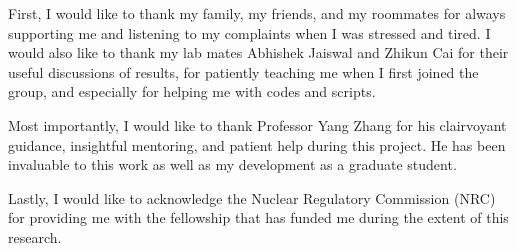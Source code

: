 First, I would like to thank my family, my friends, and my roommates for always supporting me and listening to my complaints when I was stressed and tired.  I would also like to thank my lab mates Abhishek Jaiswal and Zhikun Cai for their useful discussions of results, for patiently teaching me when I first joined the group, and especially for helping me with codes and scripts.  

Most importantly, I would like to thank Professor Yang Zhang for his clairvoyant guidance, insightful mentoring, and patient help during this project.  He has been invaluable to this work as well as my development as a graduate student.  

Lastly, I would like to acknowledge the Nuclear Regulatory Commission (NRC) for providing me with the fellowship that has funded me during the extent of this research.
